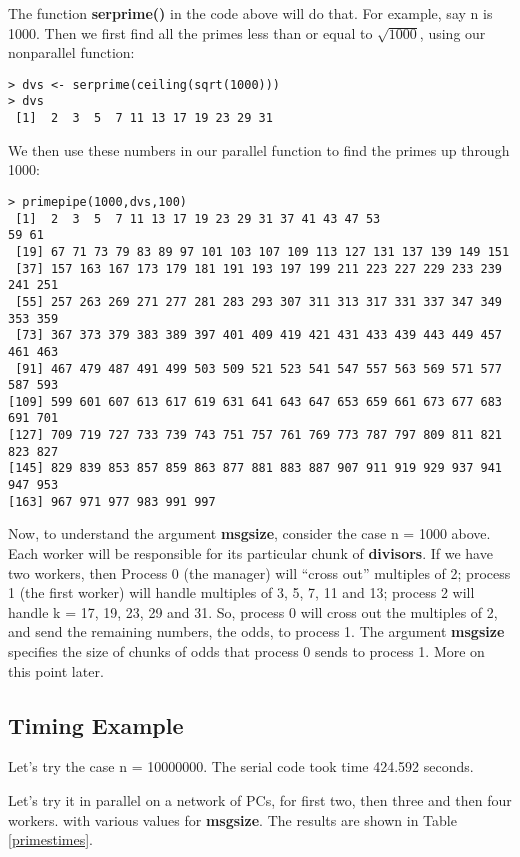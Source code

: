 The function {\bf serprime()} in the code above will do that.  For
example, say n is 1000.  Then we first find all the primes less than or
equal to $\sqrt{1000}$, using our nonparallel function:

\begin{Verbatim}[fontsize=\relsize{-2}]
> dvs <- serprime(ceiling(sqrt(1000)))
> dvs
 [1]  2  3  5  7 11 13 17 19 23 29 31
\end{Verbatim}

We then use these numbers in our parallel function to find the primes up
through 1000:

\begin{Verbatim}[fontsize=\relsize{-2}]
> primepipe(1000,dvs,100)
 [1]  2  3  5  7 11 13 17 19 23 29 31 37 41 43 47 53
59 61
 [19] 67 71 73 79 83 89 97 101 103 107 109 113 127 131 137 139 149 151
 [37] 157 163 167 173 179 181 191 193 197 199 211 223 227 229 233 239 241 251
 [55] 257 263 269 271 277 281 283 293 307 311 313 317 331 337 347 349 353 359
 [73] 367 373 379 383 389 397 401 409 419 421 431 433 439 443 449 457 461 463
 [91] 467 479 487 491 499 503 509 521 523 541 547 557 563 569 571 577 587 593
[109] 599 601 607 613 617 619 631 641 643 647 653 659 661 673 677 683 691 701
[127] 709 719 727 733 739 743 751 757 761 769 773 787 797 809 811 821 823 827
[145] 829 839 853 857 859 863 877 881 883 887 907 911 919 929 937 941 947 953
[163] 967 971 977 983 991 997
\end{Verbatim}

Now, to understand the argument {\bf msgsize}, consider the case n =
1000 above.  Each worker will be responsible for its particular chunk of
{\bf divisors}.  If we have two workers, then Process 0 (the manager)
will ``cross out'' multiples of 2; process 1 (the first worker) will
handle multiples of 3, 5, 7, 11 and 13; process 2 will handle k = 17,
19, 23, 29 and 31.  So, process 0 will cross out the multiples of 2, and
send the remaining numbers, the odds, to process 1.  The argument {\bf
msgsize} specifies the size of chunks of odds that process 0 sends to
process 1.  More on this point later.

\subsection{Timing Example}

Let's try the case n = 10000000.  The serial code took time 424.592
seconds.

Let's try it in parallel on a network of PCs, for first two, then three
and then four workers. with various values for {\bf msgsize}.  The
results are shown in Table \ref{primestimes}.

